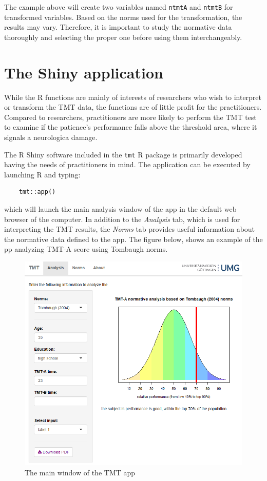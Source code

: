 \documentclass[]{article}
\begin{document}
The example above will create two variables named \texttt{ntmtA} and \texttt{ntmtB} for transformed variables. Based on the norms used for the transformation, the results may vary. Therefore, it is important to study the normative data thoroughly and selecting the proper one before using them interchangeably. 


\section{The Shiny application}

While the R functions are mainly of interests of researchers who wish to interpret or transform the TMT data, the functions are of little profit for the practitioners. Compared to researchers, practitioners are more likely to perform the TMT test to examine if the patience's performance falls above the threshold area, where it signals a neurologica damage. 

The R Shiny software included in the \texttt{tmt} R package is primarily developed having the needs of practitioners in mind. The application can be executed by launching R and typing:


\begin{verbatim}
    tmt::app()
\end{verbatim}

which will launch the main analysis window of the app in the default web browser of the computer. In addition to the \textit{Analysis} tab, which is used for interpreting the TMT results, the \textit{Norms} tab provides useful information about the normative data defined to the app. The figure below, shows an example of the pp analyzing TMT-A score using Tombaugh \citeyear{tombaugh2004trail} norms.

\begin{figure}[ht!]
	\centering
	\includegraphics[width=120mm]{./Resources/app-main.png}
	\caption{The main window of the TMT app \label{overflow}}
\end{figure}
\end{document}
